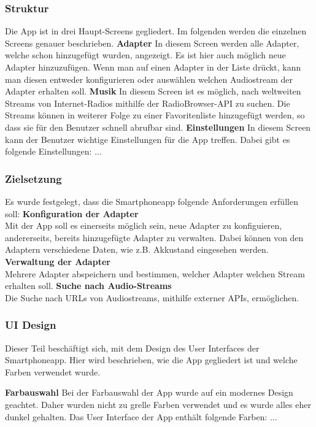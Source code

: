 \documentclass[]{article}
\begin{document}
\subsubsection{Struktur}
Die App ist in drei Haupt-Screens gegliedert. Im folgenden werden die einzelnen Screens genauer beschrieben.
\textbf{Adapter}
In diesem Screen werden alle Adapter, welche schon hinzugefügt wurden, angezeigt. Es ist hier auch möglich neue Adapter hinzuzufügen. Wenn man auf einen Adapter in der Liste drückt, kann man diesen entweder konfigurieren oder auswählen welchen Audiostream der Adapter erhalten soll.
\textbf{Musik}
In diesem Screen ist es möglich, nach weltweiten Streams von Internet-Radios mithilfe der RadioBrowser-API zu suchen. Die Streams können in weiterer Folge zu einer Favoritenliste hinzugefügt werden, so dass sie für den Benutzer schnell abrufbar sind.
\textbf{Einstellungen}
In diesem Screen kann der Benutzer wichtige Einstellungen für die App treffen. Dabei gibt es folgende Einstellungen: ...
\subsubsection{Zielsetzung}
Es wurde festgelegt, dass die Smartphoneapp folgende Anforderungen erfüllen soll:
\vspace{4mm}\newline
\textbf{Konfiguration der Adapter}  \\
Mit der App soll es einerseits möglich sein, neue Adapter zu konfiguieren, andererseits, bereits hinzugefügte Adapter zu verwalten. Dabei können von den Adaptern verschiedene Daten, wie z.B. Akkustand eingesehen werden.
\vspace{4mm}\newline
\textbf{Verwaltung der Adapter} \\
Mehrere Adapter abspeichern und bestimmen, welcher Adapter welchen Stream erhalten soll.
\vspace{4mm}\newline
\textbf{Suche nach Audio-Streams} \\
Die Suche nach URLs von Audiostreams, mithilfe externer APIs, ermöglichen.
\subsubsection{UI Design}
Dieser Teil beschäftigt sich, mit dem Design des User Interfaces der Smartphoneapp. Hier wird beschrieben, wie die App gegliedert ist und welche Farben verwendet wurde.

\textbf{Farbauswahl}
Bei der Farbauswahl der App wurde auf ein modernes Design geachtet. Daher wurden nicht zu grelle Farben verwendet und es wurde alles eher dunkel gehalten.
Das User Interface der App enthält folgende Farben:
...
\end{document}
